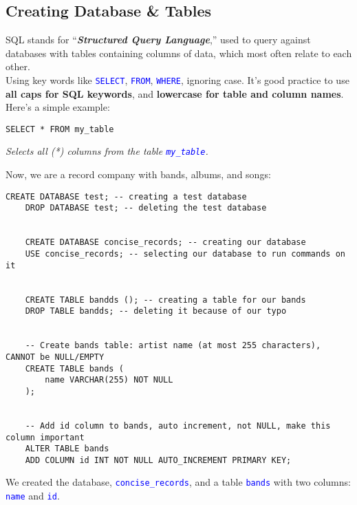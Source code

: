 \subsection{Creating Database \& Tables}





SQL stands for ``\textbf{\textit{Structured Query Language}},'' used to query against databases with tables
containing columns of data, which most often relate to each other.\\

\noindent
Using key words like \textcolor{blue}{\texttt{SELECT}}, \textcolor{blue}{\texttt{FROM}}, \textcolor{blue}{\texttt{WHERE}},
ignoring case. It's good practice to use \textbf{all caps for SQL keywords}, and \textbf{lowercase for table and column names}.
Here's a simple example:\\

\begin{lstlisting}[style=sql]
    SELECT * FROM my_table
\end{lstlisting}
\begin{centering}
    \textit{Selects all (*) columns from the table \textcolor{blue}{\texttt{my\_table}}.}\\
\end{centering}
\vspace{1em}
\noindent
Now, we are a record company with bands, albums, and songs:

\begin{lstlisting}[style=sql]
    CREATE DATABASE test; -- creating a test database
    DROP DATABASE test; -- deleting the test database


    CREATE DATABASE concise_records; -- creating our database 
    USE concise_records; -- selecting our database to run commands on it


    CREATE TABLE bandds (); -- creating a table for our bands
    DROP TABLE bandds; -- deleting it because of our typo
    

    -- Create bands table: artist name (at most 255 characters), CANNOT be NULL/EMPTY
    CREATE TABLE bands (
        name VARCHAR(255) NOT NULL
    );


    -- Add id column to bands, auto increment, not NULL, make this column important
    ALTER TABLE bands 
    ADD COLUMN id INT NOT NULL AUTO_INCREMENT PRIMARY KEY;
\end{lstlisting}

\vspace{1em}
\noindent
We created the database, \textcolor{blue}{\texttt{concise\_records}}, and a table \textcolor{blue}{\texttt{bands}}
with two columns: \textcolor{blue}{\texttt{name}} and \textcolor{blue}{\texttt{id}}.\\


